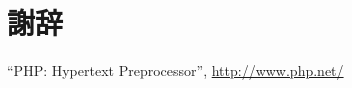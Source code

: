 \documentclass[a4paper,12pt]{ujreport}
\begin{document}

\chapter*{謝辞}



\begin{thebibliography}{99}%

   ``PHP: Hypertext Preprocessor'',
  \url{ http://www.php.net/ }

\end{thebibliography}
\appendix
\end{document}
